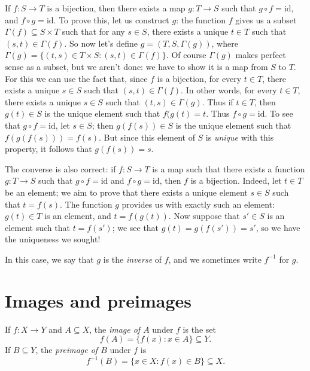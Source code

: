 \documentclass[11pt,dvipsnames]{book}
\numberwithin{equation}{section} %
\numberwithin{figure}{section} %
\numberwithin{table}{section} %
\begin{document}
If $ f \colon S \to T $ is a bijection, then there exists a map $ g \colon T \to S $ such that $g \circ f = \mathrm{id} $, and $f \circ g = \mathrm{id}$.
To prove this, let us construct $g$:
the function $f $ gives us a subset $\Gamma(f) \subseteq S \times T$ such that for any $s \in S$, there exists a unique $ t \in T$ such that $(s, t) \in \Gamma(f)$.
So now let's define $g = (T, S, \Gamma(g))$, where $\Gamma(g) = \{ (t,s) \in T \times S : (s, t) \in \Gamma(f) \}$.
Of course $\Gamma(g)$ makes perfect sense as a subset, but we aren't done:
we have to show it is a map from $S$ to $T$.
For this we can use the fact that, since $f$ is a bijection, for every $t \in T$, there exists a unique $s \in S $ such that $(s,t) \in \Gamma(f)$.
In other words, for every $t \in T$, there exists a unique $s \in S $ such that $(t,s) \in \Gamma(g)$.
Thus if $t \in T$, then $g(t) \in S$ is the unique element such that $f(g(t) = t$.
Thus $f \circ g = \mathrm{id}$.
To see that $g \circ f = \mathrm{id}$, let $ s \in S$;
then $g(f(s)) \in S$ is the unique element such that $f(g(f(s))) = f(s)$. 
But since this element of $S$ is \emph{unique} with this property, it follows that $g(f(s)) = s $.

The converse is also correct: if $f \colon S \to T$ is a map such that there exists a function $g \colon T \to S $ such that $g \circ f =\mathrm{id} $ and $f \circ g = \mathrm{id}$, then $f$ is a bijection.
Indeed, let $t \in T$ be an element;
we aim to prove that there exists a unique element $ s \in S$ such that $t = f(s)$.
The function $g$ provides us with exactly such an element: $g(t) \in T$ is an element, and $t = f(g(t))$.
Now suppose that $s'\in S$ is an element such that $t = f(s')$;
we see that $g(t) = g(f(s')) = s'$, so we have the uniqueness we sought!

In this case, we say that $g$ is the \emph{inverse} of $f$, and we sometimes write $f^{-1}$ for $g$.


\section{Images and preimages}

\begin{definition}
If $f\colon X\rightarrow Y$ and $A\subseteq X$,  the  \emph{image of $A$} under $f$ is  the set
\[
  f(A)=\{f(x):x\in A\} \subseteq Y.
\]
If $B\subseteq Y$, the  \emph{preimage of $B$} under $f$ is
\[
f^{-1}(B)=\{x\in X: f(x)\in B\} \subseteq X.
\]
\end{definition}
\end{document}
